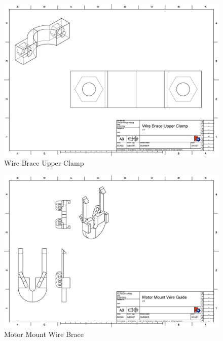 \documentclass[pdftex,11pt]{article}
\begin{document}
\begin{figure}[!h]
	\centering
		\includegraphics[width=1\textwidth]{./graphics/wire_brace_uper_clamp.eps}
	\caption{Wire Brace Upper Clamp}
	\label{fig:wirebraceupperclamp}
\end{figure}


\begin{figure}[!h]
	\centering
		\includegraphics[width=1\textwidth]{./graphics/MotorMountWireBracket.eps}
	\caption{Motor Mount Wire Brace}
	\label{fig:motormountwirebrace}
\end{figure}
\end{document}
